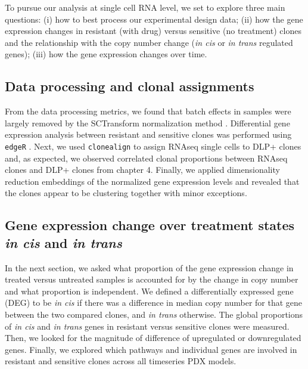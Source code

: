  

 

To pursue our analysis at single cell RNA level, we set to explore three main questions: (i) how to best  process our experimental design data; (ii) how the gene expression changes in resistant (with drug) versus sensitive (no treatment) clones and the relationship with the copy number change (\textit{in cis} or \textit{in trans} regulated genes); (iii) how the gene expression changes over time.  

\subsection{Data processing and clonal assignments}
 From the data processing metrics, we found that batch effects in samples were largely removed by the SCTransform normalization method \cite{hafemeister2019normalization}. Differential gene expression analysis between resistant and sensitive clones was performed using \texttt{edgeR} \cite{robinson2010edger}.
Next, we used \texttt{clonealign} \cite{campbell2019clonealign} to assign RNAseq single cells to DLP+ clones and, as expected, we observed correlated clonal proportions between RNAseq clones and  DLP+ clones from chapter 4. Finally,   
we applied dimensionality reduction embeddings of the normalized gene expression levels and revealed that the clones appear to be clustering together with minor exceptions. 


\subsection{Gene expression change over treatment states \textit{in cis} and \textit{in trans}} 
In the next section, we asked what proportion of the gene expression change in treated versus untreated samples is accounted for by the change in copy number and what proportion is independent. We defined a differentially expressed gene (DEG) to be \textit{in cis} if there was a difference in median copy number for that gene between the two compared clones, and \textit{in trans} otherwise. The global proportions of \textit{in cis} and \textit{in trans} genes in resistant versus sensitive clones were measured. Then, we looked for the magnitude of difference of upregulated or downregulated genes. Finally, we explored which pathways and individual genes are involved in resistant and sensitive clones across all timeseries PDX models. 

